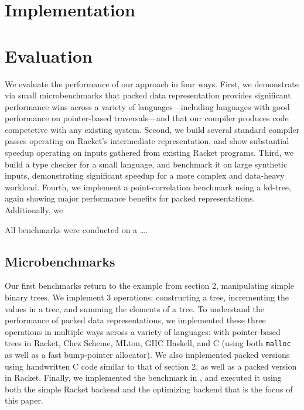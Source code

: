 \documentclass[preprint,10pt,nocopyrightspace,nonatbib]{./bibs/sigplanconf}
\begin{document}



\section{Implementation}




\section{Evaluation}

We evaluate the performance of our approach in four ways. First, we
demonstrate via small microbenchmarks that packed data representation
provides significant performance wins across a variety of
languages---including languages with good performance on pointer-based
traversals---and that our compiler produces code competetive with any
existing system. Second, we build several standard compiler passes
operating on Racket's intermediate representation, and show
substantial speedup operating on inputs gathered from existing Racket
programs. Third, we build a type checker for a small language, and
benchmark it on large synthetic inputs, demonstrating significant
speedup for a more complex and data-heavy workload. Fourth, we
implement a point-correlation benchmark using a kd-tree, again showing
major performance benefits for packed representations. Additionally,
we 

All benchmarks were conducted on a \dots.

\subsection{Microbenchmarks}

Our first benchmarks return to the example from section 2,
manipulating simple binary trees. We implement 3 operations:
constructing a tree, incrementing the values in a tree, and summing
the elements of a tree. To understand the performance of packed data
representations, we implemented these three operations in multiple
ways across a variety of languages: with pointer-based trees in
Racket, Chez Scheme, MLton, GHC Haskell, and C (using both \texttt{malloc} as well
as a fast bump-pointer allocator). We also implemented packed versions
using handwritten C code similar to that of section 2, as well as a
packed version in Racket. Finally, we implemented the benchmark in
\treelang{}, and executed it using both the simple Racket backend and
the optimizing backend that is the focus of this paper.
\end{document}
